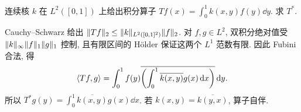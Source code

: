 \begin{exercise}\label{legacy:ch07:exercise2}
连续核 $k$ 在 $L^2([0,1])$ 上给出积分算子 $Tf(x)=\int_0^1k(x,y)f(y)\dd y$. 求 $T^*$.
\end{exercise}
\begin{solution}
Cauchy--Schwarz 给出 $\lVert Tf\rVert_2\le\lVert k\rVert_{L^2([0,1]^2)}\lVert f\rVert_2$. 对 $f,g\in L^2$, 双积分绝对值受 $\lVert k\rVert_\infty\lVert f\rVert_1\lVert g\rVert_1$ 控制, 且有限区间的 Hölder 保证这两个 $L^1$ 范数有限. 因此 Fubini 合法, 得
\[
\langle Tf,g\rangle=\int_0^1 f(y)\overline{\left(\int_0^1\overline{k(x,y)}g(x)\,\mathrm d x\right)}\,\mathrm d y.
\]
所以 $T^*g(y)=\int_0^1\overline{k(x,y)}g(x)\dd x$. 若 $k(x,y)=\overline{k(y,x)}$, 算子自伴.
\end{solution}
